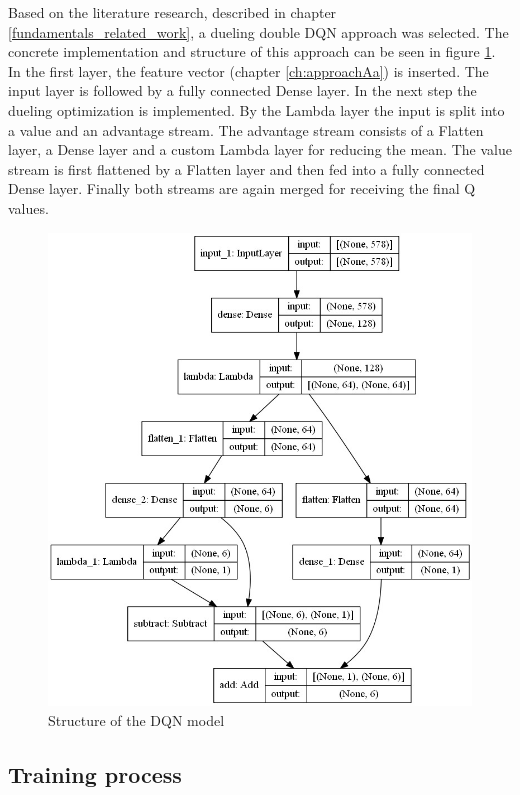 Based on the literature research, described in chapter \ref{fundamentals_related_work}, a dueling double DQN approach was selected. The concrete implementation and structure of this approach can be seen in figure \ref{fig:model}.
In the first layer, the feature vector (chapter \ref{ch:approachAa}) is inserted. The input layer is followed by a fully connected Dense layer. In the next step the dueling optimization is implemented. By the Lambda layer the input is split into a value and an advantage stream. 
The advantage stream consists of a Flatten layer, a Dense layer and a custom Lambda layer for reducing the mean.
The value stream is first flattened by a Flatten layer and then fed into a fully connected Dense layer.
Finally both streams are again merged for receiving the final Q values.

\begin{figure}[ht]
	\centering
	\includegraphics[width=0.8\linewidth]{figures/model.jpeg}
	\caption{Structure of the DQN model}
	\label{fig:model}
\end{figure}

\subsection{Training process} 
\label{ch:approachB}


